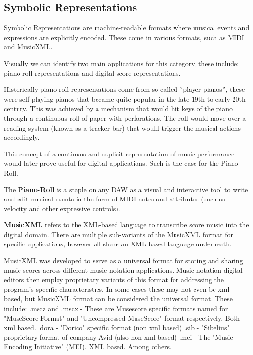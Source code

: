 \subsection{Symbolic Representations}

Symbolic Representations are machine-readable formats where musical events and expressions are explicitly encoded. These come in various formats, such as MIDI and MusicXML.

Visually we can identify two main applications for this category, these include: piano-roll representations and digital score representations. 

Historically piano-roll representations come from so-called ``player pianos'', these were self playing pianos that became quite popular in the late 19th to early 20th century. This was achieved by a mechanism that would hit keys of the piano through a continuous roll of paper with perforations. The roll would move over a reading system (known as a tracker bar) that would  trigger the musical actions accordingly. 

This concept of a continuos and explicit representation of music performance would later prove useful for digital applications. Such is the case for the Piano-Roll.

The \textbf{Piano-Roll} is a staple on any DAW as a visual and interactive tool to write and edit musical events in the form of MIDI notes and attributes (such as velocity and other expressive controls).

\textbf{MusicXML} refers to the XML-based language to transcribe score music into the digital domain. There are multiple sub-variants of the MusicXML format for specific applications, however all share an XML based language underneath. 

MusicXML was developed to serve as a universal format for storing and sharing music scores across different music notation applications. Music notation digital editors then employ proprietary variants of this format for addressing the program's specific characteristics. In some cases these may not even be xml based, but MusicXML format can be considered the universal format.
These include:
    .mscz and .mscx - These are Musescore specific formats named for "MuseScore Format" and 
    "Uncompressed MuseScore" format respectively. Both xml based.
    .dora - "Dorico" specific format (non xml based)
    .sib  - "Sibelius" proprietary format  of company Avid (also non xml based)
    .mei  - The "Music Encoding Initiative" (MEI). XML based.
    Among others.

